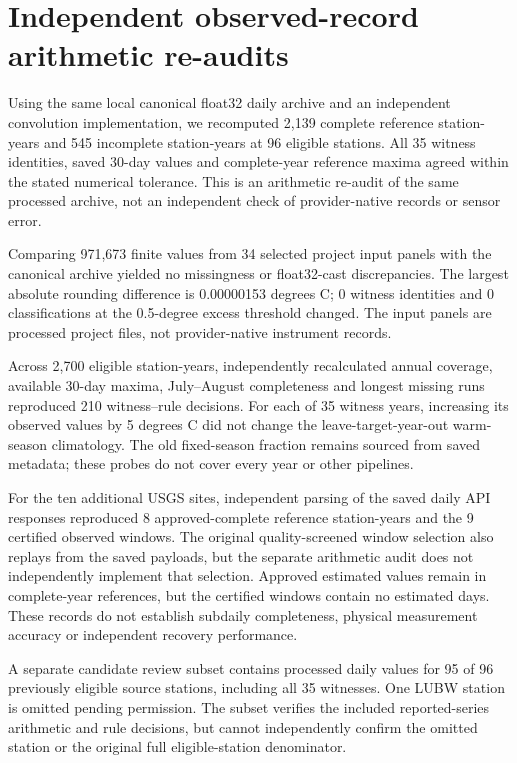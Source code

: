 \section{Independent observed-record arithmetic re-audits}

Using the same local canonical float32 daily archive and an independent convolution implementation, we recomputed 2,139 complete reference station-years and 545 incomplete station-years at 96 eligible stations. All 35 witness identities, saved 30-day values and complete-year reference maxima agreed within the stated numerical tolerance. This is an arithmetic re-audit of the same processed archive, not an independent check of provider-native records or sensor error.

Comparing 971,673 finite values from 34 selected project input panels with the canonical archive yielded no missingness or float32-cast discrepancies. The largest absolute rounding difference is 0.00000153 degrees C; 0 witness identities and 0 classifications at the 0.5-degree excess threshold changed. The input panels are processed project files, not provider-native instrument records.

Across 2,700 eligible station-years, independently recalculated annual coverage, available 30-day maxima, July--August completeness and longest missing runs reproduced 210 witness--rule decisions. For each of 35 witness years, increasing its observed values by 5 degrees C did not change the leave-target-year-out warm-season climatology. The old fixed-season fraction remains sourced from saved metadata; these probes do not cover every year or other pipelines.

For the ten additional USGS sites, independent parsing of the saved daily API responses reproduced 8 approved-complete reference station-years and the 9 certified observed windows. The original quality-screened window selection also replays from the saved payloads, but the separate arithmetic audit does not independently implement that selection. Approved estimated values remain in complete-year references, but the certified windows contain no estimated days. These records do not establish subdaily completeness, physical measurement accuracy or independent recovery performance.

A separate candidate review subset contains processed daily values for 95 of 96 previously eligible source stations, including all 35 witnesses. One LUBW station is omitted pending permission. The subset verifies the included reported-series arithmetic and rule decisions, but cannot independently confirm the omitted station or the original full eligible-station denominator.

